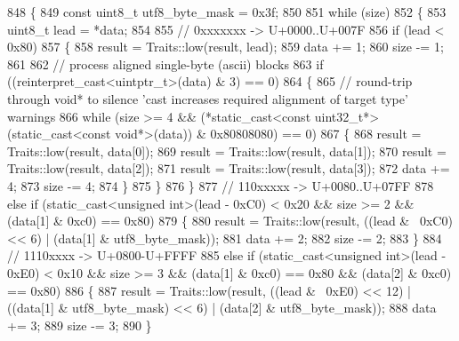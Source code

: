 \begin{DoxyCode}
848         \{
849             \textcolor{keyword}{const} uint8\_t utf8\_byte\_mask = 0x3f;
850 
851             \textcolor{keywordflow}{while} (size)
852             \{
853                 uint8\_t lead = *data;
854 
855                 \textcolor{comment}{// 0xxxxxxx -> U+0000..U+007F}
856                 \textcolor{keywordflow}{if} (lead < 0x80)
857                 \{
858                     result = Traits::low(result, lead);
859                     data += 1;
860                     size -= 1;
861 
862                     \textcolor{comment}{// process aligned single-byte (ascii) blocks}
863                     \textcolor{keywordflow}{if} ((reinterpret\_cast<uintptr\_t>(data) & 3) == 0)
864                     \{
865                         \textcolor{comment}{// round-trip through void* to silence 'cast increases required alignment of target
       type' warnings}
866                         \textcolor{keywordflow}{while} (size >= 4 && (*static\_cast<const uint32\_t*>(static\_cast<const void*>(data)) 
      & 0x80808080) == 0)
867                         \{
868                             result = Traits::low(result, data[0]);
869                             result = Traits::low(result, data[1]);
870                             result = Traits::low(result, data[2]);
871                             result = Traits::low(result, data[3]);
872                             data += 4;
873                             size -= 4;
874                         \}
875                     \}
876                 \}
877                 \textcolor{comment}{// 110xxxxx -> U+0080..U+07FF}
878                 \textcolor{keywordflow}{else} \textcolor{keywordflow}{if} (static\_cast<unsigned int>(lead - 0xC0) < 0x20 && size >= 2 && (data[1] & 0xc0) == 
      0x80)
879                 \{
880                     result = Traits::low(result, ((lead & ~0xC0) << 6) | (data[1] & utf8\_byte\_mask));
881                     data += 2;
882                     size -= 2;
883                 \}
884                 \textcolor{comment}{// 1110xxxx -> U+0800-U+FFFF}
885                 \textcolor{keywordflow}{else} \textcolor{keywordflow}{if} (static\_cast<unsigned int>(lead - 0xE0) < 0x10 && size >= 3 && (data[1] & 0xc0) == 
      0x80 && (data[2] & 0xc0) == 0x80)
886                 \{
887                     result = Traits::low(result, ((lead & ~0xE0) << 12) | ((data[1] & utf8\_byte\_mask) << 6)
       | (data[2] & utf8\_byte\_mask));
888                     data += 3;
889                     size -= 3;
890                 \}

\end{DoxyCode}
